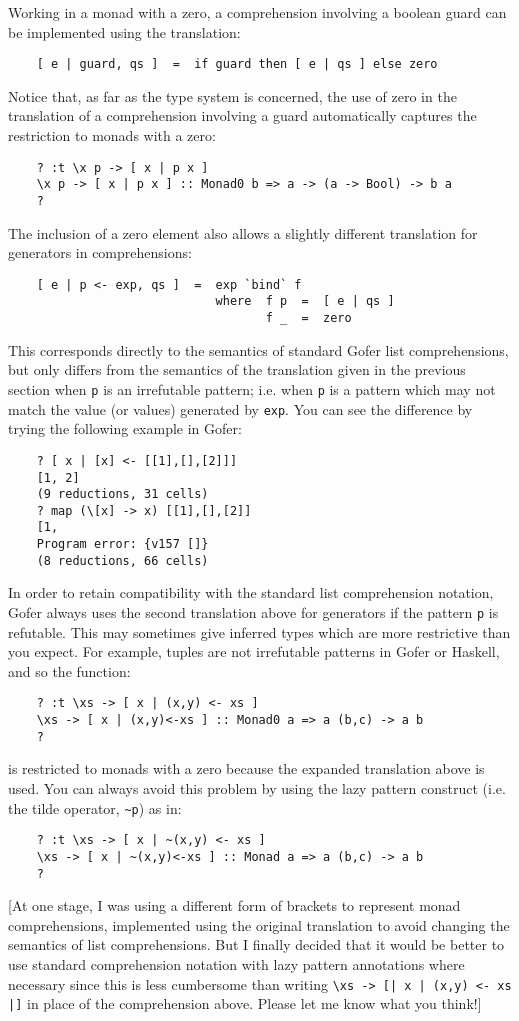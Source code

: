 Working in a monad with a zero, a comprehension involving a boolean
guard can be implemented using the translation:
\begin{verbatim}
    [ e | guard, qs ]  =  if guard then [ e | qs ] else zero
\end{verbatim}
Notice that, as far as the type system is concerned, the use of
zero in the translation of a comprehension involving a guard automatically
captures the restriction to monads with a zero:
\begin{verbatim}
    ? :t \x p -> [ x | p x ]
    \x p -> [ x | p x ] :: Monad0 b => a -> (a -> Bool) -> b a
    ?
\end{verbatim}
The inclusion of a zero element also allows a slightly different
translation for generators in comprehensions:
\begin{verbatim}
    [ e | p <- exp, qs ]  =  exp `bind` f
                             where  f p  =  [ e | qs ]
                                    f _  =  zero
\end{verbatim}
This corresponds directly to the semantics of standard Gofer list
comprehensions, but only differs from the semantics of the translation
given in the previous section when \verb"p" is an irrefutable pattern; i.e.
when \verb"p" is a pattern which may not match the value (or values) generated
by \verb"exp".  You can see the difference by trying the following example
in Gofer:
\begin{verbatim}
    ? [ x | [x] <- [[1],[],[2]]]
    [1, 2]
    (9 reductions, 31 cells)
    ? map (\[x] -> x) [[1],[],[2]]
    [1, 
    Program error: {v157 []}
    (8 reductions, 66 cells)
\end{verbatim}
In order to retain compatibility with the standard list comprehension
notation, Gofer always uses the second translation above for generators
if the pattern \verb"p" is refutable.  This may sometimes give inferred types
which are more restrictive than you expect.  For example, tuples are
not irrefutable patterns in Gofer or Haskell, and so the function:
\begin{verbatim}
    ? :t \xs -> [ x | (x,y) <- xs ]
    \xs -> [ x | (x,y)<-xs ] :: Monad0 a => a (b,c) -> a b
    ?
\end{verbatim}
is restricted to monads with a zero because the expanded translation
above is used.  You can always avoid this problem by using the lazy
pattern construct (i.e. the tilde operator, \verb"~p") as in:
\begin{verbatim}
    ? :t \xs -> [ x | ~(x,y) <- xs ]
    \xs -> [ x | ~(x,y)<-xs ] :: Monad a => a (b,c) -> a b
    ?
\end{verbatim}
[At one stage, I was using a different form of brackets to represent
monad comprehensions, implemented using the original translation to
avoid changing the semantics of list comprehensions.  But I finally
decided that it would be better to use standard comprehension notation
with lazy pattern annotations where necessary since this is less
cumbersome than writing \verb"\xs -> [| x | (x,y) <- xs |]" in place of the
comprehension above.  Please let me know what you think!]


